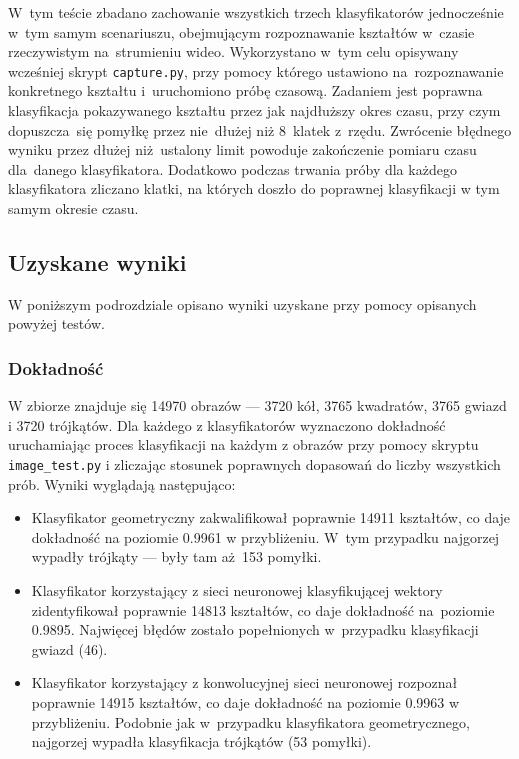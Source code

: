 \documentclass[11pt,a4paper]{article}
\begin{document}
W~tym teście zbadano zachowanie wszystkich trzech klasyfikatorów jednocześnie w~tym samym scenariuszu, obejmującym rozpoznawanie kształtów w~czasie rzeczywistym na~strumieniu wideo. Wykorzystano w~tym celu opisywany wcześniej skrypt \verb+capture.py+, przy pomocy którego ustawiono na~rozpoznawanie konkretnego kształtu i~uruchomiono próbę czasową. Zadaniem jest poprawna klasyfikacja pokazywanego kształtu przez jak najdłuższy okres czasu, przy czym dopuszcza~się pomyłkę przez nie~dłużej niż 8~klatek z~rzędu. Zwrócenie błędnego wyniku przez dłużej niż~ustalony limit powoduje zakończenie pomiaru czasu dla~danego klasyfikatora. Dodatkowo podczas trwania próby dla każdego klasyfikatora zliczano klatki, na których doszło do poprawnej klasyfikacji w tym samym okresie czasu.

\subsection{Uzyskane wyniki}

W poniższym podrozdziale opisano wyniki uzyskane przy pomocy opisanych powyżej testów.

\subsubsection{Dokładność}

W zbiorze \cite{shapes} znajduje się 14970 obrazów --- 3720 kół, 3765 kwadratów, 3765 gwiazd i 3720 trójkątów. Dla każdego z klasyfikatorów wyznaczono dokładność uruchamiając proces klasyfikacji na każdym z obrazów przy pomocy skryptu \verb+image_test.py+ i zliczając stosunek poprawnych dopasowań do liczby wszystkich prób. Wyniki wyglądają następująco:
\begin{itemize}
    \item Klasyfikator geometryczny zakwalifikował poprawnie 14911 kształtów, co daje dokładność na poziomie 0.9961 w przybliżeniu.
    W~tym przypadku najgorzej wypadły trójkąty --- były tam aż~153 pomyłki.
    \item Klasyfikator korzystający z sieci neuronowej klasyfikującej wektory zidentyfikował poprawnie 14813 kształtów, co daje dokładność na~poziomie 0.9895. Najwięcej błędów zostało popełnionych w~przypadku klasyfikacji gwiazd (46).
    \item Klasyfikator korzystający z konwolucyjnej sieci neuronowej rozpoznał poprawnie 14915 kształtów, co daje dokładność na poziomie 0.9963 w przybliżeniu. Podobnie jak w~przypadku klasyfikatora geometrycznego, najgorzej wypadła klasyfikacja trójkątów (53 pomyłki).
\end{itemize}
\end{document}
